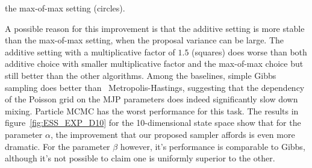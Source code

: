  the {max-of-max} setting (circles). {A possible reason for this improvement is 
  that the additive setting is more stable than the max-of-max setting, when the 
proposal variance can be large. The {additive setting with a multiplicative factor 
of $1.5$} (squares) does worse than both {additive choice with smaller multiplicative
factor and the max-of-max choice} but still better than the other algorithms. Among 
the baselines, simple Gibbs sampling 
does better than \naive\ Metropolis-Hastings, suggesting that the dependency of 
the Poisson grid on the MJP parameters does indeed significantly slow 
down mixing. Particle MCMC has the worst performance for this task. The
results in figure~\ref{fig:ESS_EXP_D10} for the 10-dimensional state space
show that for the parameter $\alpha$, the improvement that our proposed
sampler affords is even more dramatic. For the parameter $\beta$ however,
it's performance is comparable to Gibbs, although it's not possible to
claim one is uniformly superior to the other.

}
